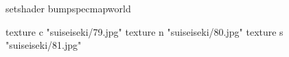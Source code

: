 setshader bumpspecmapworld

    texture c "suiseiseki/79.jpg"
    texture n "suiseiseki/80.jpg"
    texture s "suiseiseki/81.jpg"
